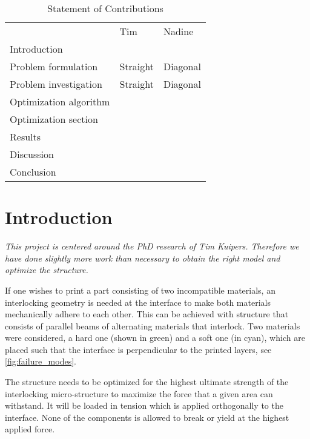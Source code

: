 \begin{table}
	\caption{Statement of Contributions}
	\begin{tabular}{lll}
		& Tim & Nadine \\
		Introduction &  \checkmark & \\
		Problem formulation & Straight & Diagonal \\
		Problem investigation & Straight & Diagonal \\
		Optimization algorithm & \checkmark & \checkmark \\
		Optimization section & \checkmark &  \\
		Results &  & \checkmark \\
		Discussion & & \checkmark \\
		Conclusion & \checkmark & \\
	\end{tabular}
\end{table}



\section{Introduction}
\textit{This project is centered around the PhD research of Tim Kuipers. Therefore we have done slightly more work than necessary to obtain the right model and optimize the structure.}

\medskip

If one wishes to print a part consisting of two incompatible materials, an interlocking geometry is needed at the interface to make both materials mechanically adhere to each other. 
This can be achieved with structure that consists of parallel beams of alternating materials that interlock. 
Two materials were considered, a hard one (shown in green) and a soft one (in cyan), which are placed such that the interface is perpendicular to the printed layers, see \cref{fig:failure_modes}.

The structure needs to be optimized for the highest ultimate strength of the interlocking micro-structure to maximize the force that a given area can withstand. 
It will be loaded in tension which is applied orthogonally to the interface. None of the components is allowed to break or yield at the highest applied force.

